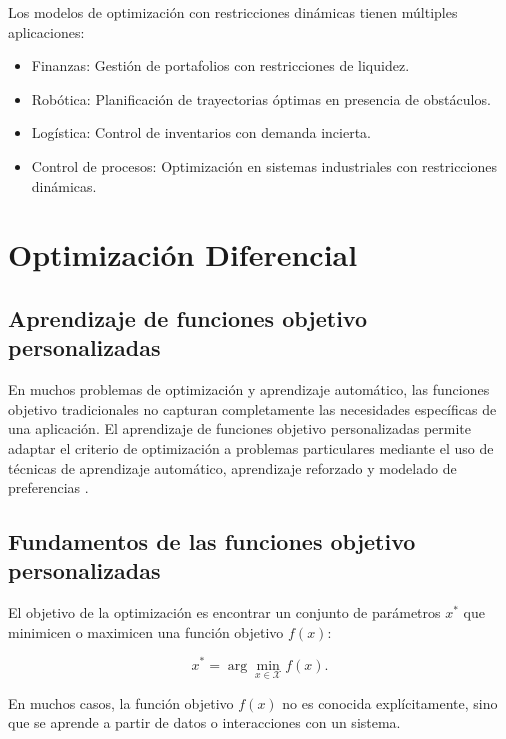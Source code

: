 \begin{itemize}
		Los modelos de optimización con restricciones dinámicas tienen múltiples aplicaciones:
		
		\begin{itemize}
			\item Finanzas: Gestión de portafolios con restricciones de liquidez.
			\item Robótica: Planificación de trayectorias óptimas en presencia de obstáculos.
			\item Logística: Control de inventarios con demanda incierta.
			\item Control de procesos: Optimización en sistemas industriales con restricciones dinámicas.
		\end{itemize}
		\section{Optimización Diferencial}
		\subsection{Aprendizaje de funciones objetivo personalizadas}
		
		En muchos problemas de optimización y aprendizaje automático, las funciones objetivo tradicionales no capturan completamente las necesidades específicas de una aplicación. El aprendizaje de funciones objetivo personalizadas permite adaptar el criterio de optimización a problemas particulares mediante el uso de técnicas de aprendizaje automático, aprendizaje reforzado y modelado de preferencias \cite{boyd2004convex}.
		
		\subsection{Fundamentos de las funciones objetivo personalizadas}
		
		El objetivo de la optimización es encontrar un conjunto de parámetros \( x^* \) que minimicen o maximicen una función objetivo \( f(x) \):
		
		\begin{equation}
			x^* = \arg \min_{x \in \mathcal{X}} f(x).
		\end{equation}
		
		En muchos casos, la función objetivo \( f(x) \) no es conocida explícitamente, sino que se aprende a partir de datos o interacciones con un sistema.
		

\end{itemize}

